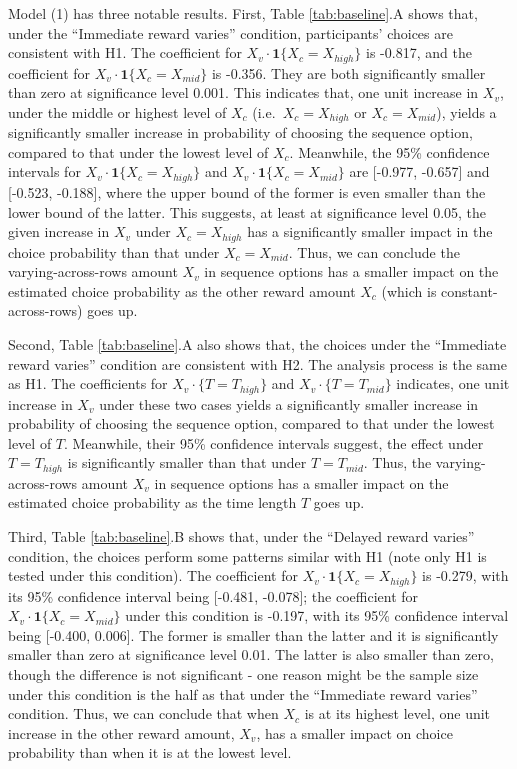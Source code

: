 \documentclass[
  12pt,
]{article}
\begin{document}
Model (1) has three notable results. First, Table \ref{tab:baseline}.A
shows that, under the ``Immediate reward varies'' condition,
participants' choices are consistent with H1. The coefficient for
\(X_v\cdot\textbf{1}\{X_c=X_{high}\}\) is -0.817, and the coefficient
for \(X_v\cdot\textbf{1}\{X_c=X_{mid}\}\) is -0.356. They are both
significantly smaller than zero at significance level 0.001. This
indicates that, one unit increase in \(X_v\), under the middle or
highest level of \(X_c\) (i.e.~\(X_c=X_{high}\) or \(X_c=X_{mid}\)),
yields a significantly smaller increase in probability of choosing the
sequence option, compared to that under the lowest level of \(X_c\).
Meanwhile, the 95\% confidence intervals for
\(X_v\cdot\textbf{1}\{X_c=X_{high}\}\) and
\(X_v\cdot\textbf{1}\{X_c=X_{mid}\}\) are {[}-0.977, -0.657{]} and
{[}-0.523, -0.188{]}, where the upper bound of the former is even
smaller than the lower bound of the latter. This suggests, at least at
significance level 0.05, the given increase in \(X_v\) under
\(X_c=X_{high}\) has a significantly smaller impact in the choice
probability than that under \(X_c=X_{mid}\). Thus, we can conclude the
varying-across-rows amount \(X_v\) in sequence options has a smaller
impact on the estimated choice probability as the other reward amount
\(X_c\) (which is constant-across-rows) goes up.

Second, Table \ref{tab:baseline}.A also shows that, the choices under
the ``Immediate reward varies'' condition are consistent with H2. The
analysis process is the same as H1. The coefficients for
\(X_v\cdot\{T=T_{high}\}\) and \(X_v\cdot\{T=T_{mid}\}\) indicates, one
unit increase in \(X_v\) under these two cases yields a significantly
smaller increase in probability of choosing the sequence option,
compared to that under the lowest level of \(T\). Meanwhile, their 95\%
confidence intervals suggest, the effect under \(T=T_{high}\) is
significantly smaller than that under \(T=T_{mid}\). Thus, the
varying-across-rows amount \(X_v\) in sequence options has a smaller
impact on the estimated choice probability as the time length \(T\) goes
up.

Third, Table \ref{tab:baseline}.B shows that, under the ``Delayed reward
varies'' condition, the choices perform some patterns similar with H1
(note only H1 is tested under this condition). The coefficient for
\(X_v\cdot\textbf{1}\{X_c=X_{high}\}\) is -0.279, with its 95\%
confidence interval being {[}-0.481, -0.078{]}; the coefficient for
\(X_v\cdot\textbf{1}\{X_c=X_{mid}\}\) under this condition is -0.197,
with its 95\% confidence interval being {[}-0.400, 0.006{]}. The former
is smaller than the latter and it is significantly smaller than zero at
significance level 0.01. The latter is also smaller than zero, though
the difference is not significant - one reason might be the sample size
under this condition is the half as that under the ``Immediate reward
varies'' condition. Thus, we can conclude that when \(X_c\) is at its
highest level, one unit increase in the other reward amount, \(X_v\),
has a smaller impact on choice probability than when it is at the lowest
level.
\end{document}

